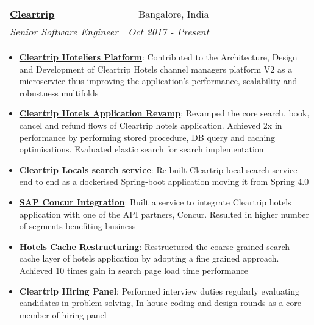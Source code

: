 \documentclass[letterpaper,11pt]{article}
\makeatletter
\newcommand{\resumeItem}[2]{
  \item\small{
    \textbf{#1}{: #2 \vspace{-2pt}}
  }
}
\newcommand{\resumeSubheading}[4]{
  \vspace{-1pt}\item
    \begin{tabular*}{0.97\textwidth}{l@{\extracolsep{\fill}}r}
      \textbf{#1} & #2 \\
      \textit{\small#3} & \textit{\small #4} \\
    \end{tabular*}\vspace{-5pt}
}
\newcommand{\resumeItemListStart}{\begin{itemize}}
\newcommand{\resumeItemListEnd}{\end{itemize}\vspace{-5pt}}
\makeatother
\begin{document}
    \resumeSubheading
      {\href{www.cleartrip.com}{Cleartrip}}{Bangalore, India}
      {Senior Software Engineer}{Oct 2017 - Present}
      \resumeItemListStart
          \resumeItem{\href{https://suite.cleartrip.com/login}{Cleartrip Hoteliers Platform}}
          {Contributed to the Architecture, Design and Development of Cleartrip Hotels channel managers platform V2 as a microservice thus improving the application's performance, scalability and robustness multifolds}
          \resumeItem{\href{https://www.cleartrip.com/hotels}{Cleartrip Hotels Application Revamp}}
          {Revamped the core search, book, cancel and refund flows of Cleartrip hotels application. Achieved 2x in performance by performing stored procedure, DB query and caching optimisations. Evaluated elastic search for search implementation}
          \resumeItem{\href{https://www.cleartrip.com/local}{Cleartrip Locals search service}}
          {Re-built Cleartrip local search service end to end as a dockerised Spring-boot application moving it from Spring 4.0}
          \resumeItem{\href{https://www.concur.co.in/travel-management}{SAP Concur Integration}}
          {Built a service to integrate Cleartrip hotels application with one of the API partners, Concur. Resulted in higher number of segments benefiting business}
          \resumeItem{Hotels Cache Restructuring}
          {Restructured the coarse grained search cache layer of hotels application by adopting a fine grained approach. Achieved 10 times gain in search page load time performance}
          \resumeItem{Cleartrip Hiring Panel}
          {Performed interview duties regularly evaluating candidates in problem solving, In-house coding and design rounds as a core member of hiring panel}
      \resumeItemListEnd
      
\end{document}
